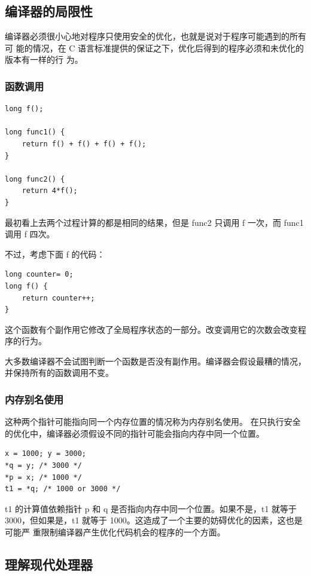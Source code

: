 \subsection{编译器的局限性}

编译器必须很小心地对程序只使用安全的优化，也就是说对于程序可能遇到的所有可
能的情况，在 C 语言标准提供的保证之下，优化后得到的程序必须和未优化的版本有一样的行
为。
\subsubsection{函数调用}

\begin{lstlisting}[style=CStyle]
long f();

long func1() {
    return f() + f() + f() + f();
}

long func2() {
    return 4*f();
}
\end{lstlisting}

最初看上去两个过程计算的都是相同的结果，但是 func2 只调用 f 一次，而 func1 调用 f 四次。

不过，考虑下面 f 的代码：
\begin{lstlisting}[style=CStyle]
long counter= 0;
long f() {
    return counter++;
}
\end{lstlisting}

这个函数有个副作用它修改了全局程序状态的一部分。改变调用它的次数会改变程序的行为。

大多数编译器不会试图判断一个函数是否没有副作用。编译器会假设最糟的情况，并保持所有的函数调用不变。

\subsubsection{内存别名使用}

这种两个指针可能指向同一个内存位置的情况称为内存别名使用。
在只执行安全的优化中，编译器必须假设不同的指针可能会指向内存中同一个位置。

\begin{lstlisting}[style=CStyle]
x = 1000; y = 3000;
*q = y; /* 3000 */
*p = x; /* 1000 */
t1 = *q; /* 1000 or 3000 */
\end{lstlisting}

t1 的计算值依赖指针 p 和 q 是否指向内存中同一个位置。如果不是，t1 就等于
3000，但如果是，t1 就等于 1000。这造成了一个主要的妨碍优化的因素，这也是可能严
重限制编译器产生优化代码机会的程序的一个方面。

\subsection{理解现代处理器}

